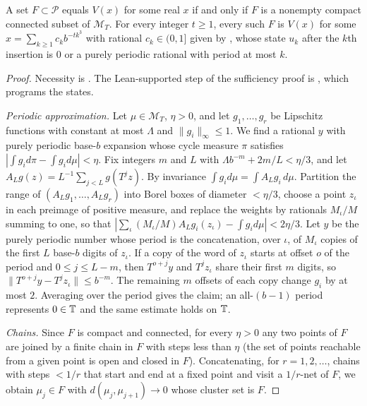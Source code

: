 \documentclass[11pt]{article}
\newcommand{\dist}[1]{\lVert #1\rVert}
\newcommand{\Prob}{\mathcal P}
\newcommand{\Minv}{\mathcal M_T}
\begin{document}
\begin{theorem}\label{thm:limitsets}
A set $F\subset\Prob$ equals $V(x)$ for some real $x$ if and only if $F$ is a nonempty compact
connected subset of $\Minv$. For every integer $t\ge1$, every such $F$ is $V(x)$ for some
$x=\sum_{k\ge1}c_kb^{-tk^3}$ with rational $c_k\in(0,1]$ given by , whose state $u_k$
after the $k$th insertion is $0$ or a purely periodic rational with period at most $k$.
\end{theorem}

\begin{proof}
Necessity is . The Lean-supported step of the sufficiency proof is
, which programs the states.

\emph{Periodic approximation.} Let $\mu\in\Minv$, $\eta>0$, and let $g_1,\ldots,g_r$ be
Lipschitz functions with constant at most $\Lambda$ and $\|g_i\|_\infty\le1$. We find a rational $y$
with purely periodic base-$b$ expansion whose cycle measure $\pi$ satisfies
$|\int g_id\pi-\int g_id\mu|<\eta$. Fix integers $m$ and $L$ with $\Lambda b^{-m}+2m/L<\eta/3$, and let
$A_Lg(z)=L^{-1}\sum_{j<L}g(T^jz)$. By invariance $\int g_id\mu=\int A_Lg_i\,d\mu$. Partition the
range of $(A_Lg_1,\ldots,A_Lg_r)$ into Borel boxes of diameter $<\eta/3$, choose a point $z_\iota$ in
each preimage of positive measure, and replace the weights by rationals $M_\iota/M$ summing to one,
so that $|\sum_\iota(M_\iota/M)A_Lg_i(z_\iota)-\int g_id\mu|<2\eta/3$. Let $y$ be the purely periodic
number whose period is the concatenation, over $\iota$, of $M_\iota$ copies of the first $L$
base-$b$ digits of $z_\iota$. If a copy of the word of $z_\iota$ starts at offset $o$ of the period
and $0\le j\le L-m$, then $T^{o+j}y$ and $T^jz_\iota$ share their first $m$ digits, so
$\dist{T^{o+j}y-T^jz_\iota}\le b^{-m}$. The remaining $m$ offsets of each copy change $g_i$ by at
most $2$. Averaging over the period gives the claim; an
all-$(b-1)$ period represents $0\in\mathbb T$ and the same estimate holds on $\mathbb T$.

\emph{Chains.} Since $F$ is compact and connected, for every $\eta>0$ any two points of $F$ are
joined by a finite chain in $F$ with steps less than $\eta$ (the set of points reachable from a
given point is open and closed in $F$). Concatenating, for $r=1,2,\ldots$, chains with steps
$<1/r$ that start and end at a fixed point and visit a $1/r$-net of $F$, we obtain $\mu_j\in F$
with $d(\mu_j,\mu_{j+1})\to0$ whose cluster set is $F$.


\end{proof}
\end{document}
